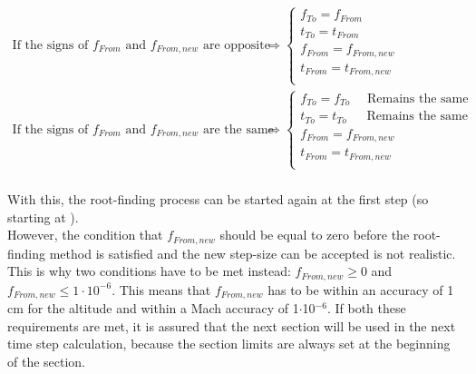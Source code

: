 \begin{equation}\label{eq:updatedPointsRoot}
\begin{split}
\text{If the signs of }f_{From}\text{ and }f_{From,new}\text{ are opposite}&\Rightarrow\begin{cases}
f_{To}=f_{From}\\
t_{To}=t_{From} \\
f_{From}=f_{From,new}\\
t_{From}=t_{From,new} \\ 
\end{cases}\\
\text{If the signs of }f_{From}\text{ and }f_{From,new}\text{ are the same}&\Rightarrow\begin{cases}
f_{To}=f_{To} \quad \text{  Remains the same}\\
t_{To}=t_{To} \quad \ \text{  Remains the same}\\
f_{From}=f_{From,new}\\
t_{From}=t_{From,new} \\ 
\end{cases}\\
\end{split}
\end{equation}

\noindent
With this, the root-finding process can be started again at the first step (so starting at ).\\

\noindent
However, the condition that $f_{From,new}$ should be equal to zero before the root-finding method is satisfied and the new step-size can be accepted is not realistic. This is why two conditions have to be met instead: $f_{From,new}\geq 0$ and $f_{From,new}\leq 1\cdot10^{-6}$. This means that $f_{From,new}$ has to be within an accuracy of 1 cm for the altitude and within a Mach accuracy of 1$\cdot$10$^{-6}$. If both these requirements are met, it is assured that the next section will be used in the next time step calculation, because the section limits are always set at the beginning of the section.  




